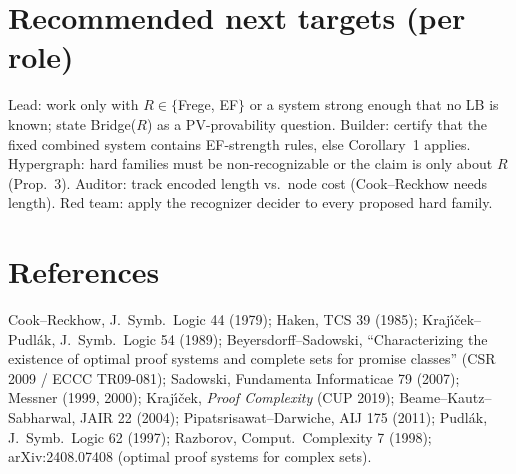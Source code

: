 \documentclass[11pt]{article}
\begin{document}
\section*{Recommended next targets (per role)}
Lead: work only with $R\in\{$Frege, EF$\}$ or a system strong enough that no LB is known; state Bridge($R$) as a PV-provability question.
Builder: certify that the fixed combined system contains EF-strength rules, else Corollary~1 applies.
Hypergraph: hard families must be non-recognizable or the claim is only about $R$ (Prop.~3).
Auditor: track encoded length vs.\ node cost (Cook--Reckhow needs length).
Red team: apply the recognizer decider to every proposed hard family.

\section*{References}
Cook--Reckhow, J.~Symb.~Logic 44 (1979); Haken, TCS 39 (1985); Kraj\'{\i}\v{c}ek--Pudlák, J.~Symb.~Logic 54 (1989);
Beyersdorff--Sadowski, ``Characterizing the existence of optimal proof systems and complete sets for promise classes'' (CSR 2009 / ECCC TR09-081);
Sadowski, Fundamenta Informaticae 79 (2007); Messner (1999, 2000); Kraj\'{\i}\v{c}ek, \emph{Proof Complexity} (CUP 2019);
Beame--Kautz--Sabharwal, JAIR 22 (2004); Pipatsrisawat--Darwiche, AIJ 175 (2011);
Pudlák, J.~Symb.~Logic 62 (1997); Razborov, Comput.~Complexity 7 (1998); arXiv:2408.07408 (optimal proof systems for complex sets).
\end{document}
